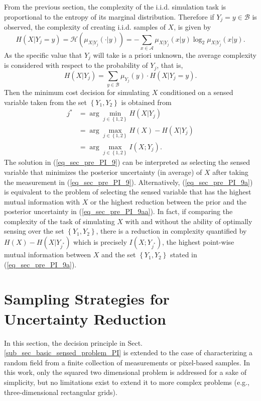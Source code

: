 From the previous section, the complexity of the i.i.d. simulation task is proportional to the entropy of its marginal distribution. Therefore if $Y_j=y\in \mathcal{B}$ is observed, the complexity of creating i.i.d. samples of $X$, is given by
\begin{equation}
H(X|Y_j=y)=\mathcal{H}(\mu_{X|Y_j}(\cdot|y))= - \sum_{x\in \mathcal{A}} \mu_{X|Y_j}(x|y) \log_2 \mu_{X|Y_j}(x|y).
\end{equation}
As the specific value that $Y_j$ will take is a priori unknown, the average complexity is considered with respect to the probability of $Y_j$, that is,
\begin{equation}
H(X|Y_j)=\sum_{y\in \mathcal{B}} \mu_{Y_j}(y)\cdot H(X|Y_j=y).
\end{equation}
Then the minimum cost decision for simulating $X$ conditioned on a sensed variable taken from the set $\left\{Y_1,Y_2 \right\}$ is obtained from
\begin{align}\label{eq_sec_pre_PI_9}
	j^*	&=\arg\min_{j\in \left\{1,2 \right\}} H(X|Y_j)\\
		\label{eq_sec_pre_PI_9aa}
		&=\arg\max_{j\in \left\{1,2 \right\}} H(X)-H(X|Y_j)\\
		\label{eq_sec_pre_PI_9a}
		&=\arg\max_{j\in \left\{1,2 \right\}} I(X;Y_j).
\end{align}
The solution in (\ref{eq_sec_pre_PI_9}) can be interpreted as selecting the sensed variable that minimizes the posterior uncertainty (in average) of $X$ after taking the measurement in (\ref{eq_sec_pre_PI_9}). Alternatively, (\ref{eq_sec_pre_PI_9a}) is equivalent to the problem of selecting the sensed variable that has the highest mutual information with $X$ or the highest reduction between the prior and the posterior uncertainty in (\ref{eq_sec_pre_PI_9aa}). In fact, if comparing the complexity of the task of simulating $X$  with and without the ability of optimally sensing over the set $\left\{ Y_1,Y_2\right\}$, there is a reduction in complexity quantified by $H(X)- H(X|Y_{j^*})$ which is precisely $I(X;Y_{j^*})$,  the highest point-wise mutual information between $X$ and the set $\left\{ Y_1,Y_2\right\}$ stated in (\ref{eq_sec_pre_PI_9a}). 

\section{{Sampling} Strategies for Uncertainty Reduction}
\label{sec_owp_PI}
In this section, the decision principle in Sect. \ref{sub_sec_basic_sensed_problem_PI} is extended to the case of characterizing a random field from a finite collection of  measurements or pixel-based samples. 
In this work, only the squared two dimensional
problem is addressed for a sake of simplicity, but no limitations exist to extend it to more complex problems (e.g., three-dimensional rectangular grids). 

